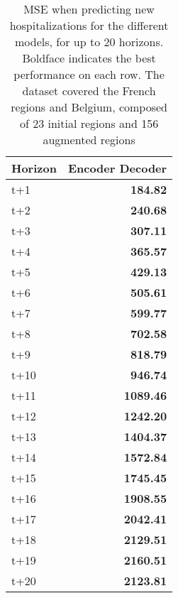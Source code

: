 \begin{table}[H]
\centering
\caption{MSE when predicting new hospitalizations for the different models, for up to 20 horizons. Boldface indicates the best performance on each row. The dataset covered the French regions and Belgium, composed of 23 initial regions and 156 augmented regions }
\label{tab:MSE_comparison}
\begin{tabular}{lr}
\toprule
Horizon &  Encoder Decoder \\
\midrule
t+1  & \textbf{184.82}  \\
t+2  & \textbf{240.68}  \\
t+3  & \textbf{307.11}  \\
t+4  & \textbf{365.57}  \\
t+5  & \textbf{429.13}  \\
t+6  & \textbf{505.61}  \\
t+7  & \textbf{599.77}  \\
t+8  & \textbf{702.58}  \\
t+9  & \textbf{818.79}  \\
t+10  & \textbf{946.74}  \\
t+11  & \textbf{1089.46}  \\
t+12  & \textbf{1242.20}  \\
t+13  & \textbf{1404.37}  \\
t+14  & \textbf{1572.84}  \\
t+15  & \textbf{1745.45}  \\
t+16  & \textbf{1908.55}  \\
t+17  & \textbf{2042.41}  \\
t+18  & \textbf{2129.51}  \\
t+19  & \textbf{2160.51}  \\
t+20  & \textbf{2123.81}  \\

\bottomrule
\end{tabular}
\end{table}

